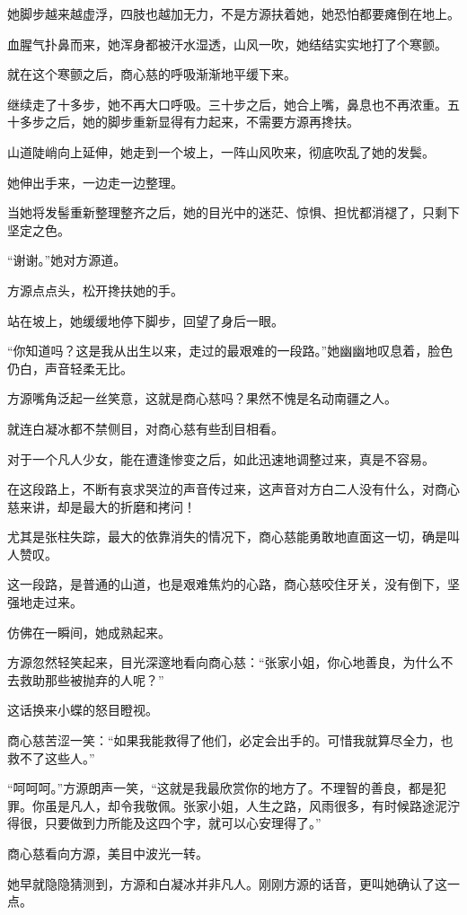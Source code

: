\begin{this_body}
她脚步越来越虚浮，四肢也越加无力，不是方源扶着她，她恐怕都要瘫倒在地上。

血腥气扑鼻而来，她浑身都被汗水湿透，山风一吹，她结结实实地打了个寒颤。

就在这个寒颤之后，商心慈的呼吸渐渐地平缓下来。

继续走了十多步，她不再大口呼吸。三十步之后，她合上嘴，鼻息也不再浓重。五十多步之后，她的脚步重新显得有力起来，不需要方源再搀扶。

山道陡峭向上延伸，她走到一个坡上，一阵山风吹来，彻底吹乱了她的发鬓。

她伸出手来，一边走一边整理。

当她将发髻重新整理整齐之后，她的目光中的迷茫、惊惧、担忧都消褪了，只剩下坚定之色。

“谢谢。”她对方源道。

方源点点头，松开搀扶她的手。

站在坡上，她缓缓地停下脚步，回望了身后一眼。

“你知道吗？这是我从出生以来，走过的最艰难的一段路。”她幽幽地叹息着，脸色仍白，声音轻柔无比。

方源嘴角泛起一丝笑意，这就是商心慈吗？果然不愧是名动南疆之人。

就连白凝冰都不禁侧目，对商心慈有些刮目相看。

对于一个凡人少女，能在遭逢惨变之后，如此迅速地调整过来，真是不容易。

在这段路上，不断有哀求哭泣的声音传过来，这声音对方白二人没有什么，对商心慈来讲，却是最大的折磨和拷问！

尤其是张柱失踪，最大的依靠消失的情况下，商心慈能勇敢地直面这一切，确是叫人赞叹。

这一段路，是普通的山道，也是艰难焦灼的心路，商心慈咬住牙关，没有倒下，坚强地走过来。

仿佛在一瞬间，她成熟起来。

方源忽然轻笑起来，目光深邃地看向商心慈：“张家小姐，你心地善良，为什么不去救助那些被抛弃的人呢？”

这话换来小蝶的怒目瞪视。

商心慈苦涩一笑：“如果我能救得了他们，必定会出手的。可惜我就算尽全力，也救不了这些人。”

“呵呵呵。”方源朗声一笑，“这就是我最欣赏你的地方了。不理智的善良，都是犯罪。你虽是凡人，却令我敬佩。张家小姐，人生之路，风雨很多，有时候路途泥泞得很，只要做到力所能及这四个字，就可以心安理得了。”

商心慈看向方源，美目中波光一转。

她早就隐隐猜测到，方源和白凝冰并非凡人。刚刚方源的话音，更叫她确认了这一点。


\end{this_body}
